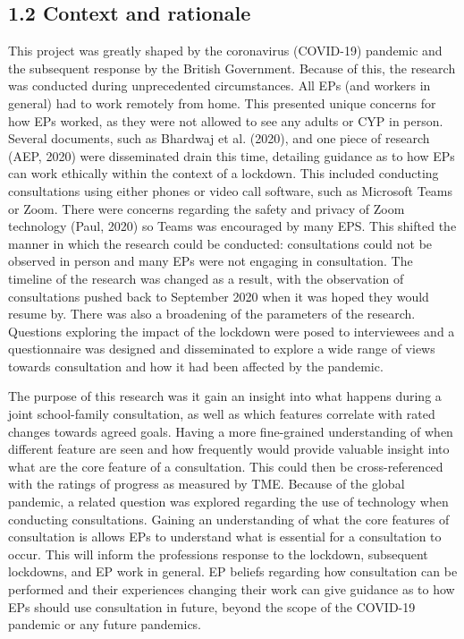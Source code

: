 \documentclass[
  english,
  man]{apa7}
\begin{document}
\hypertarget{context-and-rationale}{%
\subsection{1.2 Context and rationale}\label{context-and-rationale}}

This project was greatly shaped by the coronavirus (COVID-19) pandemic and the subsequent response by the British Government. Because of this, the research was conducted during unprecedented circumstances. All EPs (and workers in general) had to work remotely from home. This presented unique concerns for how EPs worked, as they were not allowed to see any adults or CYP in person. Several documents, such as Bhardwaj et al. (2020), and one piece of research (AEP, 2020) were disseminated drain this time, detailing guidance as to how EPs can work ethically within the context of a lockdown. This included conducting consultations using either phones or video call software, such as Microsoft Teams or Zoom. There were concerns regarding the safety and privacy of Zoom technology (Paul, 2020) so Teams was encouraged by many EPS. This shifted the manner in which the research could be conducted: consultations could not be observed in person and many EPs were not engaging in consultation. The timeline of the research was changed as a result, with the observation of consultations pushed back to September 2020 when it was hoped they would resume by. There was also a broadening of the parameters of the research. Questions exploring the impact of the lockdown were posed to interviewees and a questionnaire was designed and disseminated to explore a wide range of views towards consultation and how it had been affected by the pandemic.

The purpose of this research was it gain an insight into what happens during a joint school-family consultation, as well as which features correlate with rated changes towards agreed goals. Having a more fine-grained understanding of when different feature are seen and how frequently would provide valuable insight into what are the core feature of a consultation. This could then be cross-referenced with the ratings of progress as measured by TME. Because of the global pandemic, a related question was explored regarding the use of technology when conducting consultations. Gaining an understanding of what the core features of consultation is allows EPs to understand what is essential for a consultation to occur. This will inform the professions response to the lockdown, subsequent lockdowns, and EP work in general. EP beliefs regarding how consultation can be performed and their experiences changing their work can give guidance as to how EPs should use consultation in future, beyond the scope of the COVID-19 pandemic or any future pandemics.
\end{document}
